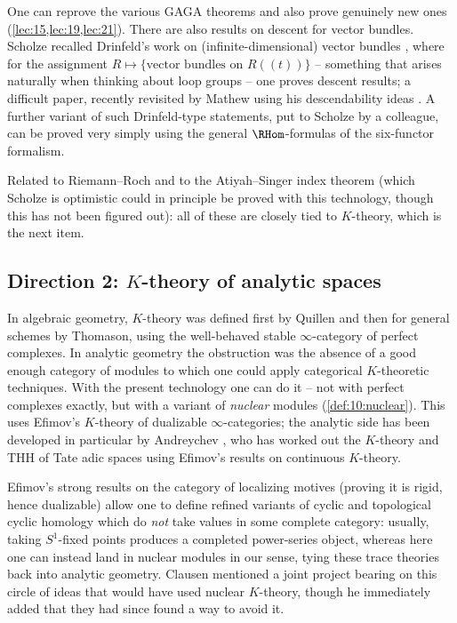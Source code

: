 \begin{remark}
\label{rmk:24:gaga-vb}
One can reprove the various GAGA theorems and also prove genuinely new ones
(\cref{lec:15,lec:19,lec:21}). There are also results on descent for vector
bundles. Scholze recalled Drinfeld's work on (infinite-dimensional) vector
bundles \cite{drinfeld2004infinitedimensionalvectorbundlesalgebraic}, where for
the assignment $R\mapsto\{\text{vector bundles on }R(\!(t)\!)\}$ -- something
that arises naturally when thinking about loop groups -- one proves descent
results; a difficult paper, recently revisited by Mathew using his
descendability ideas \cite{mathew2016galoisgroupstablehomotopy}. A further
variant of such Drinfeld-type statements, put to Scholze by a colleague, can be
proved very simply using the general $\RHom$-formulas of the six-functor
formalism.
\end{remark}

Related to Riemann--Roch and to the Atiyah--Singer index theorem (which Scholze
is optimistic could in principle be proved with this technology, though this has
not been figured out): all of these are closely tied to $K$-theory, which is the
next item.

\subsection{Direction 2: \texorpdfstring{$K$}{K}-theory of analytic spaces}
\label{subsec:24:k-theory}

In algebraic geometry, $K$-theory was defined first by Quillen and then for
general schemes by Thomason, using the well-behaved stable $\infty$-category of
perfect complexes. In analytic geometry the obstruction was the absence of a
good enough category of modules to which one could apply categorical
$K$-theoretic techniques. With the present technology one can do it -- not with
perfect complexes exactly, but with a variant of \emph{nuclear} modules
(\cref{def:10:nuclear}). This uses Efimov's $K$-theory of dualizable
$\infty$-categories; the analytic side has been developed in particular by
Andreychev \cite{andreychev2023ktheorieadischerraume}, who has
worked out the $K$-theory and THH of Tate adic spaces using Efimov's results on
continuous $K$-theory.

\begin{remark}
\label{rmk:24:localizing-motives}
Efimov's strong results on the category of localizing motives (proving it is
rigid, hence dualizable) allow one to define refined variants of cyclic and
topological cyclic homology which do \emph{not} take values in some complete
category: usually, taking $S^1$-fixed points produces a completed power-series
object, whereas here one can instead land in nuclear modules in our sense, tying
these trace theories back into analytic geometry. Clausen mentioned a joint
project bearing on this circle of ideas that would have used nuclear $K$-theory,
though he immediately added that they had since found a way to avoid it.
\end{remark}

